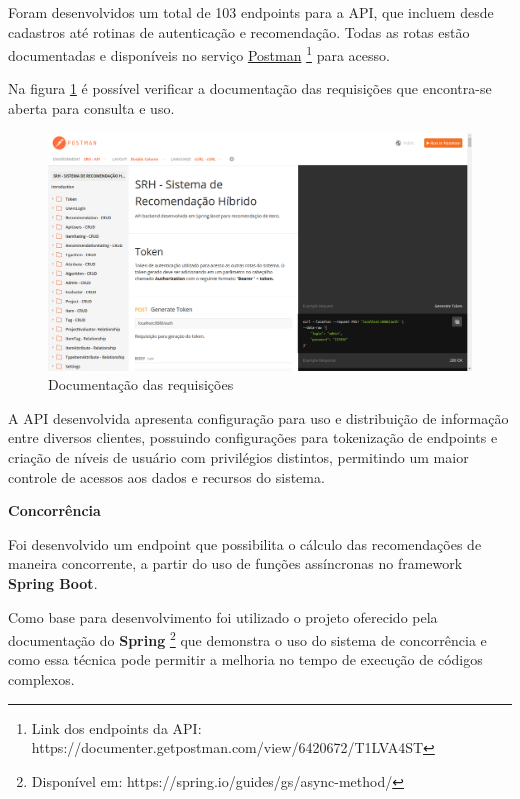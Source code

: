 Foram desenvolvidos um total de 103 endpoints para a API, que incluem desde cadastros até rotinas de autenticação e recomendação. Todas as rotas estão documentadas e disponíveis no serviço \href{https://documenter.getpostman.com/view/6420672/T1LVA4ST}{Postman} \footnote{Link dos endpoints da API: https://documenter.getpostman.com/view/6420672/T1LVA4ST} para acesso.

Na figura \ref{fig:requisicaoPostman} é possível verificar a documentação das requisições que encontra-se aberta para consulta e uso.

\begin{figure}[H]
	\centering
	\includegraphics[width=1\linewidth]{imagens/requisicoesPostman.png}
	\caption[Documentação das requisições]{Documentação das requisições}
    \label{fig:requisicaoPostman}
\end{figure}

A API desenvolvida apresenta configuração para uso e distribuição de informação entre diversos clientes, possuindo configurações para tokenização de endpoints e criação de níveis de usuário com privilégios distintos, permitindo um maior controle de acessos aos dados e recursos do sistema.

\textbf{Concorrência}

Foi desenvolvido um endpoint que possibilita o cálculo das recomendações de maneira concorrente, a partir do uso de funções assíncronas no framework \textbf{Spring Boot}.

Como base para desenvolvimento foi utilizado o projeto oferecido pela documentação do \textbf{Spring} \footnote{Disponível em: https://spring.io/guides/gs/async-method/} que demonstra o uso do sistema de concorrência e como essa técnica pode permitir a melhoria no tempo de execução de códigos complexos.
\newline

